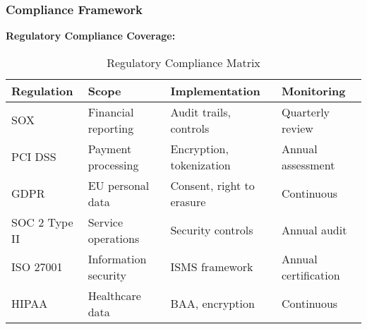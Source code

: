 \subsubsection{Compliance Framework}

\textbf{Regulatory Compliance Coverage:}

\begin{table}[h]
\centering
\begin{tabular}{|l|l|l|l|}
\hline
\textbf{Regulation} & \textbf{Scope} & \textbf{Implementation} & \textbf{Monitoring} \\
\hline
SOX & Financial reporting & Audit trails, controls & Quarterly review \\
\hline
PCI DSS & Payment processing & Encryption, tokenization & Annual assessment \\
\hline
GDPR & EU personal data & Consent, right to erasure & Continuous \\
\hline
SOC 2 Type II & Service operations & Security controls & Annual audit \\
\hline
ISO 27001 & Information security & ISMS framework & Annual certification \\
\hline
HIPAA & Healthcare data & BAA, encryption & Continuous \\
\hline
\end{tabular}
\caption{Regulatory Compliance Matrix}
\end{table}

